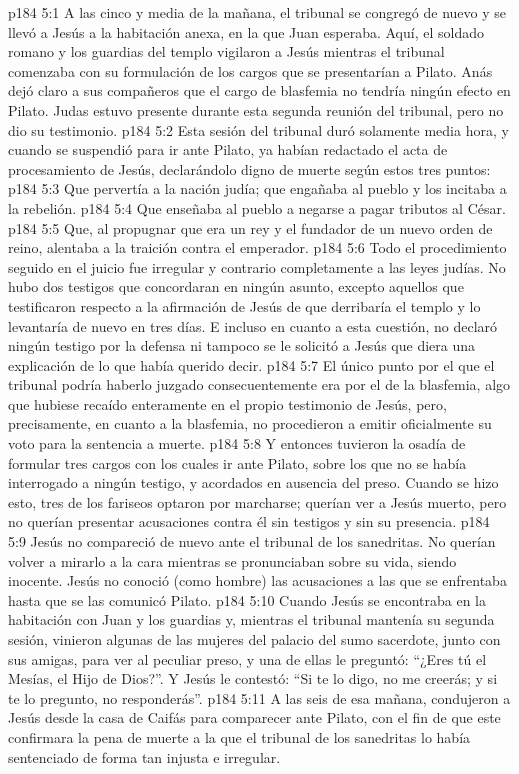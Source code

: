 \vs p184 5:1 A las cinco y media de la mañana, el tribunal se congregó de nuevo y se llevó a Jesús a la habitación anexa, en la que Juan esperaba. Aquí, el soldado romano y los guardias del templo vigilaron a Jesús mientras el tribunal comenzaba con su formulación de los cargos que se presentarían a Pilato. Anás dejó claro a sus compañeros que el cargo de blasfemia no tendría ningún efecto en Pilato. Judas estuvo presente durante esta segunda reunión del tribunal, pero no dio su testimonio.
\vs p184 5:2 Esta sesión del tribunal duró solamente media hora, y cuando se suspendió para ir ante Pilato, ya habían redactado el acta de procesamiento de Jesús, declarándolo digno de muerte según estos tres puntos:
\vs p184 5:3 Que pervertía a la nación judía; que engañaba al pueblo y los incitaba a la rebelión.
\vs p184 5:4 Que enseñaba al pueblo a negarse a pagar tributos al César.
\vs p184 5:5 Que, al propugnar que era un rey y el fundador de un nuevo orden de reino, alentaba a la traición contra el emperador.
\vs p184 5:6 \pc Todo el procedimiento seguido en el juicio fue irregular y contrario completamente a las leyes judías. No hubo dos testigos que concordaran en ningún asunto, excepto aquellos que testificaron respecto a la afirmación de Jesús de que derribaría el templo y lo levantaría de nuevo en tres días. E incluso en cuanto a esta cuestión, no declaró ningún testigo por la defensa ni tampoco se le solicitó a Jesús que diera una explicación de lo que había querido decir.
\vs p184 5:7 El único punto por el que el tribunal podría haberlo juzgado consecuentemente era por el de la blasfemia, algo que hubiese recaído enteramente en el propio testimonio de Jesús, pero, precisamente, en cuanto a la blasfemia, no procedieron a emitir oficialmente su voto para la sentencia a muerte.
\vs p184 5:8 Y entonces tuvieron la osadía de formular tres cargos con los cuales ir ante Pilato, sobre los que no se había interrogado a ningún testigo, y acordados en ausencia del preso. Cuando se hizo esto, tres de los fariseos optaron por marcharse; querían ver a Jesús muerto, pero no querían presentar acusaciones contra él sin testigos y sin su presencia.
\vs p184 5:9 Jesús no compareció de nuevo ante el tribunal de los sanedritas. No querían volver a mirarlo a la cara mientras se pronunciaban sobre su vida, siendo inocente. Jesús no conoció (como hombre) las acusaciones a las que se enfrentaba hasta que se las comunicó Pilato.
\vs p184 5:10 \pc Cuando Jesús se encontraba en la habitación con Juan y los guardias y, mientras el tribunal mantenía su segunda sesión, vinieron algunas de las mujeres del palacio del sumo sacerdote, junto con sus amigas, para ver al peculiar preso, y una de ellas le preguntó: “¿Eres tú el Mesías, el Hijo de Dios?”. Y Jesús le contestó: “Si te lo digo, no me creerás; y si te lo pregunto, no responderás”.
\vs p184 5:11 A las seis de esa mañana, condujeron a Jesús desde la casa de Caifás para comparecer ante Pilato, con el fin de que este confirmara la pena de muerte a la que el tribunal de los sanedritas lo había sentenciado de forma tan injusta e irregular.
